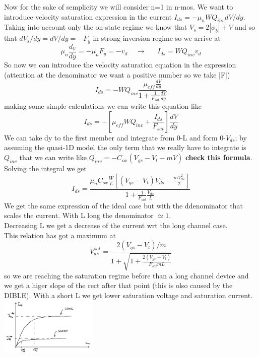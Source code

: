 Now for the sake of semplicity we will consider n=1 in n-mos. We want to introduce velocity saturation expression in the current $I_{ds}=-\mu_nWQ_{inv}dV/dy$. Taking into account only the on-state regime we know that $V_s=2|\phi_b|+V$ and so that $dV_s/dy=dV/dy=-F_{y}$ in strong inversion regime so we arrive at 
\begin{equation}
\mu_n \frac{d_V}{dy}=-\mu_nF_y=-v_d \ \ \ \ \ \rightarrow  \ \ \ \ \ \ \ I_{ds}=WQ_{inv}v_d
\end{equation}
So now we can introduce the velocity saturation equation in the expression (attention at the denominator we want a positive number so we take |F|)
\begin{equation}
I_{ds}=-WQ_{inv}\frac{\mu_{eff}\frac{dV}{dy}}{1+\frac{1}{F_{sat}}\frac{dV}{dy}}
\end{equation}
making some simple calculations we can write this equation like
\begin{equation}
I_{ds}=-[\mu_{eff}WQ_{inv}+\frac{I_{ds}}{F_{sat}}]\frac{dV}{dy}
\end{equation}
We can take dy to the first member and integrate from 0-L and form 0-$V_{ds}$; by assuming the quasi-1D model the only term that we really have to integrate is $Q_{inv}$ that we can write like $Q_{inv}=-C_{ox}(V_{gs}-V_t-mV)$ {\bf check this formula}.\\
Solving the integral we get
\begin{equation}
I_{ds}=\frac{\mu_nC_{ox}\frac{W}{L}[(V_{gs}-V_t)V_{ds}-\frac{mV_{ds}^2}{2}]}{1+\frac{1}{F_{sat}}\frac{V_{ds}}{L}}
\end{equation}
We get the same expression of the ideal case but with the ddenominator that scales the current. With L long the denominator $\simeq 1$.\\
Decreasing L we get a decrease of the current wrt the long channel case.\\
This relation has got a maximum at 
\begin{equation}
V_{ds}^{sat}=\frac{2(V_{gs}-V_t)/m}{1+\sqrt{1+\frac{2(V_{gs}-V_t)}{F_{sat}mL}}}
\end{equation}
so we are reaching the saturation regime before than a long channel device and we get a higer slope of the rect after that point (this is olso caused by the DIBLE). With a short L we get lower saturation voltage and saturation current.\\

\centering
\includegraphics[width=0.35\textwidth]{ls.png}\\ %
\raggedright

